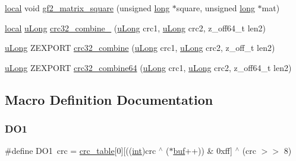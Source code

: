 \begin{DoxyCompactItemize}
\item 
\mbox{\hyperlink{zutil_8h_a08023ea6765c99d60a6a3840cd07156e}{local}} void \mbox{\hyperlink{third-party_2zlib_2crc32_8c_a797362ba54180ad549b381abfcde80c3}{gf2\+\_\+matrix\+\_\+square}} (unsigned \mbox{\hyperlink{ioapi_8h_a3c7b35ad9dab18b8310343c201f7b27e}{long}} $\ast$square, unsigned \mbox{\hyperlink{ioapi_8h_a3c7b35ad9dab18b8310343c201f7b27e}{long}} $\ast$mat)
\item 
\mbox{\hyperlink{zutil_8h_a08023ea6765c99d60a6a3840cd07156e}{local}} \mbox{\hyperlink{ioapi_8h_a50e9e9d5c30e481de822ad68fe537986}{u\+Long}} \mbox{\hyperlink{third-party_2zlib_2crc32_8c_a36a8eb95bf402949b5a68f7157df7ca2}{crc32\+\_\+combine\+\_\+}} (\mbox{\hyperlink{ioapi_8h_a50e9e9d5c30e481de822ad68fe537986}{u\+Long}} crc1, \mbox{\hyperlink{ioapi_8h_a50e9e9d5c30e481de822ad68fe537986}{u\+Long}} crc2, z\+\_\+off64\+\_\+t len2)
\item 
\mbox{\hyperlink{ioapi_8h_a50e9e9d5c30e481de822ad68fe537986}{u\+Long}} Z\+E\+X\+P\+O\+RT \mbox{\hyperlink{third-party_2zlib_2crc32_8c_aa7a1dc42a5d07c76263f4130f23d4515}{crc32\+\_\+combine}} (\mbox{\hyperlink{ioapi_8h_a50e9e9d5c30e481de822ad68fe537986}{u\+Long}} crc1, \mbox{\hyperlink{ioapi_8h_a50e9e9d5c30e481de822ad68fe537986}{u\+Long}} crc2, z\+\_\+off\+\_\+t len2)
\item 
\mbox{\hyperlink{ioapi_8h_a50e9e9d5c30e481de822ad68fe537986}{u\+Long}} Z\+E\+X\+P\+O\+RT \mbox{\hyperlink{third-party_2zlib_2crc32_8c_ac14c100da9646dc4b3d1422ffe736829}{crc32\+\_\+combine64}} (\mbox{\hyperlink{ioapi_8h_a50e9e9d5c30e481de822ad68fe537986}{u\+Long}} crc1, \mbox{\hyperlink{ioapi_8h_a50e9e9d5c30e481de822ad68fe537986}{u\+Long}} crc2, z\+\_\+off64\+\_\+t len2)
\end{DoxyCompactItemize}


\subsection{Macro Definition Documentation}
\mbox{\label{third-party_2zlib_2crc32_8c_aff265ea9630e020c8ac850c18d5d972f}} 
\subsubsection{\texorpdfstring{D\+O1}{DO1}}
{\footnotesize\ttfamily \#define D\+O1~crc = \mbox{\hyperlink{crc32_8h_a986309491edc1f872ec298c2c5fa5157}{crc\+\_\+table}}\mbox{[}0\mbox{]}\mbox{[}((\mbox{\hyperlink{ioapi_8h_a787fa3cf048117ba7123753c1e74fcd6}{int}})crc $^\wedge$ ($\ast$\mbox{\hyperlink{ioapi_8h_a8ad8a13c88886b9f623034ff88570adb}{buf}}++)) \& 0xff\mbox{]} $^\wedge$ (crc $>$$>$ 8)}

